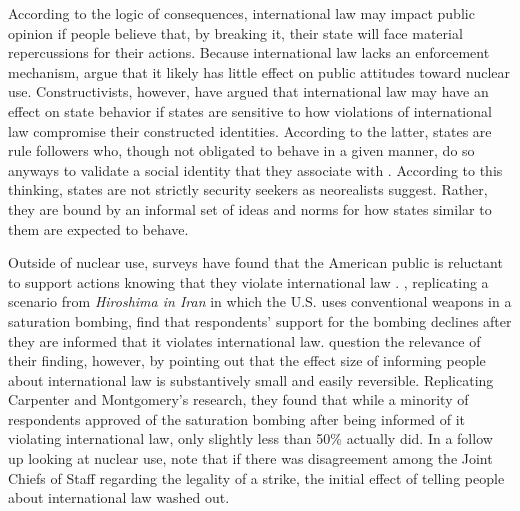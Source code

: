 \documentclass[12pt]{article}
\begin{document}
According to the logic of consequences, international law may impact public opinion if people believe that, by breaking it, their state will face material repercussions for their actions. Because international law lacks an enforcement mechanism, \citet{sagan_does_2020} argue that it likely has little effect on public attitudes toward nuclear use. Constructivists, however, have argued that international law may have an effect on state behavior if states are sensitive to how violations of international law compromise their constructed identities. According to the latter, states are rule followers who, though not obligated to behave in a given manner, do so anyways to validate a social identity that they associate with \citep{fearon_skeptical_2002}. According to this thinking, states are not strictly security seekers as neorealists suggest. Rather, they are bound by an informal set of ideas and norms for how states similar to them are expected to behave. 

Outside of nuclear use, surveys have found that the American public is reluctant to support actions knowing that they violate international law \citep{chilton_laws_2014, kreps_flying_2014}. \citet{carpenter_stopping_2020}, replicating a scenario from \textit{Hiroshima in Iran} in which the U.S. uses conventional weapons in a saturation bombing, find that respondents' support for the bombing declines after they are informed that it violates international law. \citet{sagan_does_2020} question the relevance of their finding, however, by pointing out that the effect size of informing people about international law is substantively small and easily reversible. Replicating Carpenter and Montgomery's research, they found that while a minority of respondents approved of the saturation bombing after being informed of it violating international law, only slightly less than 50\% actually did. In a follow up looking at nuclear use, \citet{sagan_atomic_2024} note that if there was disagreement among the Joint Chiefs of Staff regarding the legality of a strike, the initial effect of telling people about international law washed out.
\end{document}
